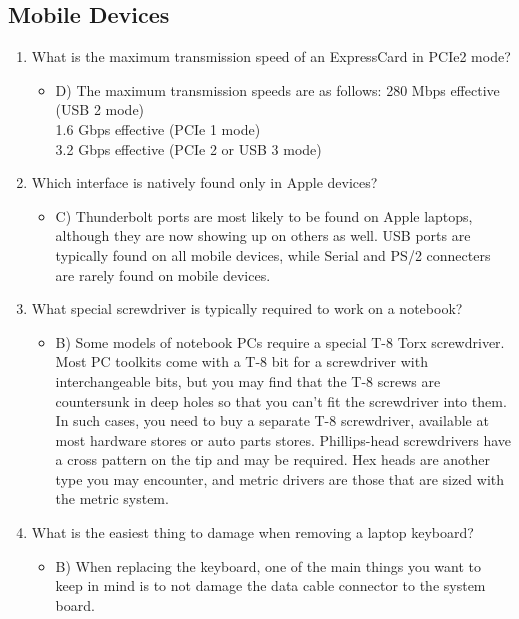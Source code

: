 \documentclass{article}
\begin{document}
\subsection{Mobile Devices}
\begin{enumerate}
    \item What is the maximum transmission speed of an ExpressCard in PCIe2 mode?
    \begin{itemize}
        \item D) The maximum transmission speeds are as follows: 280 Mbps effective (USB 2 mode) \\
        1.6 Gbps effective (PCIe 1 mode) \\
        3.2 Gbps effective (PCIe 2 or USB 3 mode) 
    \end{itemize}
    \item Which interface is natively found only in Apple devices?
    \begin{itemize}
        \item C) Thunderbolt ports are most likely to be found on Apple laptops, although they are now
showing up on others as well. USB ports are typically found on all mobile devices, while
Serial and PS/2 connecters are rarely found on mobile devices.
    \end{itemize}
     \item What special screwdriver is typically required to work on a notebook?
    \begin{itemize}
        \item B) Some models of notebook PCs require a special T-8 Torx screwdriver. Most PC toolkits
come with a T-8 bit for a screwdriver with interchangeable bits, but you may find that the
T-8 screws are countersunk in deep holes so that you can’t fit the screwdriver into them. In
such cases, you need to buy a separate T-8 screwdriver, available at most hardware stores
or auto parts stores. Phillips-head screwdrivers have a cross pattern on the tip and may be
required. Hex heads are another type you may encounter, and metric drivers are those that
are sized with the metric system.
    \end{itemize}
     \item What is the easiest thing to damage when removing a laptop keyboard?
    \begin{itemize}
        \item B) When replacing the keyboard, one of the main things you want to keep in mind is to not
damage the data cable connector to the system board.
    \end{itemize}

\end{enumerate}
\end{document}
